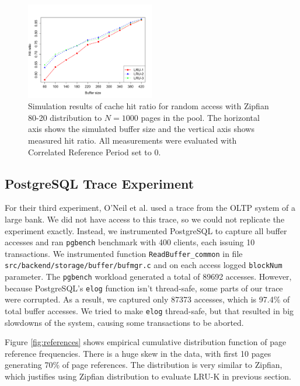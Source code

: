\begin{figure}[t!]
    \centering
	\includegraphics[width=0.5\textwidth]{./figures/zipfian.pdf}
	\caption{Simulation results of cache hit ratio for random access with Zipfian 80-20 distribution to $N = 1000$ pages in the pool. The horizontal axis shows the simulated buffer size and the vertical axis shows measured hit ratio. All measurements were evaluated with Correlated Reference Period set to 0.}
	\label{fig:zipfian}
\end{figure}


\subsection{PostgreSQL Trace Experiment}

For their third experiment, O'Neil et al. \cite{lruk} used a trace from the OLTP system of a large bank. We did not have access to this trace, so we could not replicate the experiment exactly. Instead, we instrumented PostgreSQL to capture all buffer accesses and ran \texttt{pgbench} benchmark with 400 clients, each issuing 10 transactions. We instrumented function \texttt{ReadBuffer\_common} in file \texttt{src/backend/storage/buffer/bufmgr.c} and on each access logged \texttt{blockNum} parameter. The \texttt{pgbench} workload generated a total of 89692 accesses. However, because PostgreSQL's \texttt{elog} function isn't thread-safe, some parts of our trace were corrupted. As a result, we captured only 87373 accesses, which is 97.4\% of total buffer accesses. We tried to make \texttt{elog} thread-safe, but that resulted in big slowdowns of the system, causing some transactions to be aborted. 

Figure \ref{fig:references} shows empirical cumulative distribution function of page reference frequencies. There is a huge skew in the data, with first 10 pages generating 70\% of page references. The distribution is very similar to Zipfian, which justifies using Zipfian distribution to evaluate LRU-K in previous section. 

